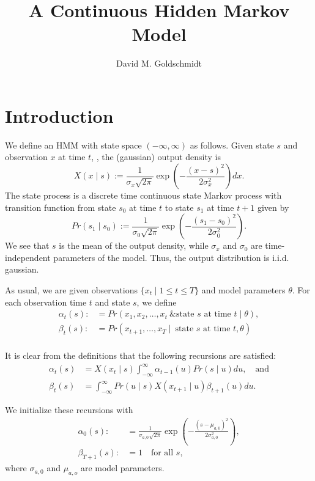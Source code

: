 \documentclass[12pt,leqno]{article}
\title{A Continuous Hidden Markov Model}
\author{David M. Goldschmidt}
\begin{document}
\newcommand{\p}{\ensuremath{u}}
\newcommand{\VV}{V}
\maketitle

\section{Introduction}
We define an HMM with state space $(-\infty,\infty)$ as follows.  Given state $s$ and observation $x$ at time
$t$, , the (gaussian) output density is
$$
X(x\mid s) := \frac{1}{\sigma_x\sqrt{2\pi}}\exp\left(-\frac{(x-s)^2}{2\sigma_x^2}\right)dx.
$$
The state process is a discrete time continuous state Markov process with transition function
from state $s_0$ at time $t$ to state $s_1$ at time $t+1$ given by
$$
Pr(s_1\mid s_0) :=  \frac{1}{\sigma_0\sqrt{2\pi}}\exp\left(-\frac{(s_1-s_0)^2}{2\sigma_0^2}\right).
$$
We see that $s$ is the mean of the output density, while $\sigma_x$ and $\sigma_0$ are time-independent
parameters of the model. Thus, the output distribution is i.i.d. gaussian.

As usual, we are given observations $\{x_t\mid 1\le t\le T\}$ and model parameters $\theta$.
For each observation time $t$ and state $s$, we define
\begin{align*}
  \alpha_t(s) :&= Pr(x_1,x_2,\dots,x_t~ \& \text{state $s$ at time $t$}\mid \theta ),\\
  \beta_t(s) :&= Pr(x_{t+1},\dots,x_T \mid ~\text{state $s$ at time $t$},\theta)\\
\end{align*}

It is clear from the definitions that the following recursions are satisfied:
\begin{align}
\alpha_t(s) &= X(x_t \mid s)\int_{-\infty}^{\infty}\alpha_{t-1}(u)Pr(s \mid u)du,\quad\text{and}\label{alpha:0}\\
\beta_t(s) &= \int_{-\infty}^{\infty}Pr(u \mid s)X(x_{t+1} \mid u)\beta_{t+1}(u)du.\label{beta:0}
\end{align}

We initialize these recursions with
\begin{align*}
\alpha_0(s) :&= \frac{1}{\sigma_{a,0}\sqrt{2\pi}}\exp\left(-\frac{(s-\mu_{a,0})^2}{2\sigma_{a,0}^2}\right),\\
\beta_{T+1}(s) :&= 1 \quad\text{for all $s$},
\end{align*}
where $\sigma_{a,0}$ and $\mu_{a,o}$ are model parameters.
\end{document}
